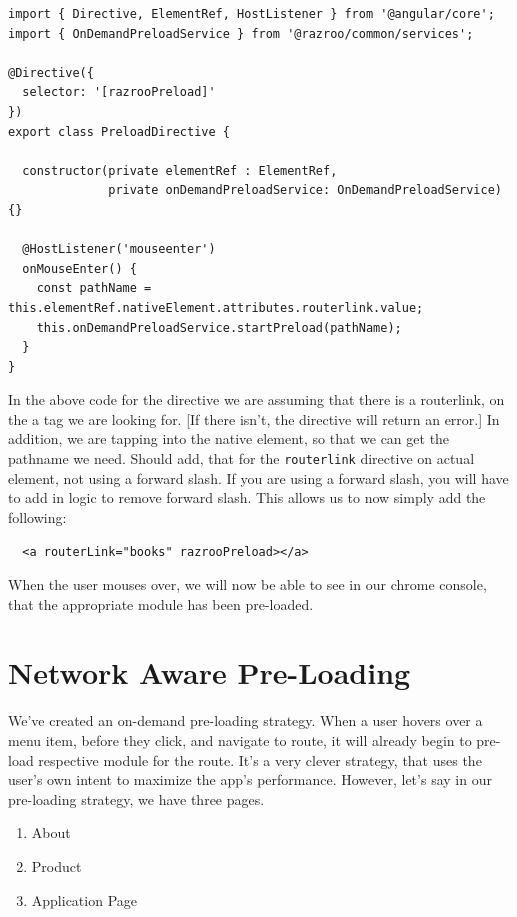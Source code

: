 \begin{lstlisting}[caption=preload.directive.ts]
import { Directive, ElementRef, HostListener } from '@angular/core';
import { OnDemandPreloadService } from '@razroo/common/services';

@Directive({
  selector: '[razrooPreload]'
})
export class PreloadDirective {

  constructor(private elementRef : ElementRef,
              private onDemandPreloadService: OnDemandPreloadService) {}

  @HostListener('mouseenter')
  onMouseEnter() {
    const pathName = this.elementRef.nativeElement.attributes.routerlink.value;
    this.onDemandPreloadService.startPreload(pathName);
  }
}
\end{lstlisting}

In the above code for the directive we are assuming that there 
is a routerlink, on the a tag we are looking for. [If there isn't, the directive 
will return an error.] In addition, we are tapping into the native element, so that 
we can get the pathname we need. Should add, that for the \lstinline{routerlink} 
directive on actual element, not using a forward slash. If you are using a forward 
slash, you will have to add in logic to remove forward slash. This allows us to
now simply add the following: 
\begin{lstlisting}
  <a routerLink="books" razrooPreload></a> 
\end{lstlisting}

When the user mouses over, we will now be able to see in our chrome console,
that the appropriate module has been pre-loaded. 

\section{ Network Aware Pre-Loading }
We've created an on-demand pre-loading strategy. When a user hovers over a 
menu item, before they click, and navigate to route, it will already begin to
pre-load respective module for the route. It's a very clever strategy, that
uses the user's own intent to maximize the app's performance. However, 
let's say in our pre-loading strategy, we have three pages. 
\begin{enumerate}
  \item About 
  \item Product
  \item Application Page
\end{enumerate}

